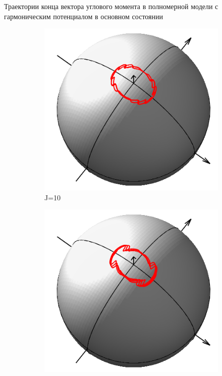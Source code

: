 \documentclass[hyperref={pdfpagelabels=false},usepdftitle=false, xcolor = dvipsnames]{beamer}
\begin{document}
\begin{frame}{\small Траектории конца вектора углового момента в полномерной модели с гармоническим потенциалом в основном состоянии}
  \begin{block}{}
	\begin{figure}
	  \begin{subfigure}{0.25\textwidth}
	    \includegraphics[width = \linewidth]{../pictures/HarmGroundState00/plot_J=10.png}
	    \caption{J=10}
	  \end{subfigure}
	  \begin{subfigure}{0.25\textwidth}
	    \includegraphics[width = \linewidth]{../pictures/HarmGroundState00/plot_J=15.png}

\end{subfigure}
\end{figure}
\end{block}
\end{frame}
\end{document}
